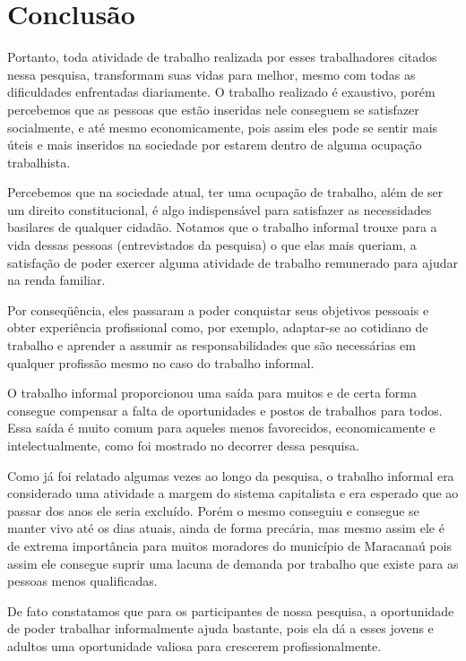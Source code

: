 \chapter{Conclusão}

Portanto, toda atividade de trabalho realizada por esses trabalhadores citados nessa pesquisa, transformam suas vidas para melhor, mesmo com todas as dificuldades enfrentadas diariamente. O trabalho realizado é exaustivo, porém percebemos que as pessoas que estão inseridas nele conseguem se satisfazer socialmente, e até mesmo economicamente, pois assim eles pode se sentir mais úteis e mais inseridos na sociedade por estarem dentro de alguma ocupação trabalhista.

Percebemos que na sociedade atual, ter uma ocupação de trabalho, além de ser um direito constitucional, é algo indispensável para satisfazer as necessidades basilares de qualquer cidadão. Notamos que o trabalho informal trouxe para a vida dessas pessoas (entrevistados da pesquisa) o que elas mais queriam, a satisfação de poder exercer alguma atividade de trabalho remunerado para ajudar na renda familiar. 

Por conseqüência, eles passaram a poder conquistar seus objetivos pessoais e obter experiência profissional como, por exemplo, adaptar-se ao cotidiano de trabalho e aprender a assumir as responsabilidades que são necessárias em qualquer profissão mesmo no caso do trabalho informal.

O trabalho informal proporcionou uma saída para muitos e de certa forma consegue compensar a falta de oportunidades e postos de trabalhos para todos.  Essa saída é muito comum para aqueles menos favorecidos, economicamente e intelectualmente, como foi mostrado no decorrer dessa pesquisa.

Como já foi relatado algumas vezes ao longo da pesquisa, o trabalho informal era considerado uma atividade a margem do sistema capitalista e era esperado que ao passar dos anos ele seria excluído. Porém o mesmo conseguiu e consegue se manter vivo até os dias atuais, ainda de forma precária, mas mesmo assim ele é de extrema importância para muitos moradores do município de Maracanaú pois assim ele consegue suprir uma lacuna de demanda por trabalho que existe para as pessoas menos qualificadas.

De fato constatamos que para os participantes de nossa pesquisa, a oportunidade de poder trabalhar informalmente ajuda bastante, pois ela dá a esses jovens e adultos uma oportunidade valiosa para crescerem profissionalmente.

